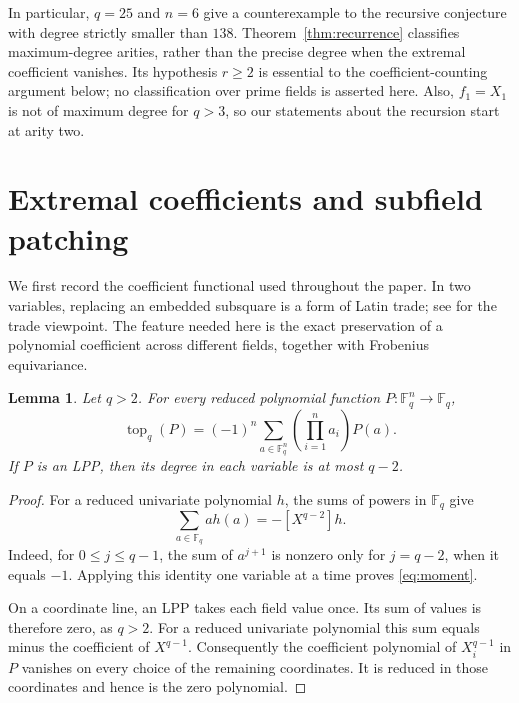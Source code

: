 \documentclass[11pt]{article}
\newtheorem{lemma}[theorem]{Lemma}
\theoremstyle{remark}\newtheorem{remark}[theorem]{Remark}
\newcommand{\F}{\mathbb F}
\newcommand{\topc}{\operatorname{top}}
\begin{document}
In particular, $q=25$ and $n=6$ give a counterexample to the recursive
conjecture with degree strictly smaller than $138$. Theorem~\ref{thm:recurrence}
classifies maximum-degree arities, rather than the precise degree when the
extremal coefficient vanishes. Its hypothesis $r\geq2$ is essential to the
coefficient-counting argument below; no classification over prime fields is
asserted here. Also, $f_1=X_1$ is not of maximum degree for $q>3$, so our
statements about the recursion start at arity two.

\section{Extremal coefficients and subfield patching}

We first record the coefficient functional used throughout the paper.
In two variables, replacing an embedded subsquare is a form of Latin trade;
see \cite[Section 1]{CF} for the trade viewpoint. The feature needed here is
the exact preservation of a polynomial coefficient across different fields,
together with Frobenius equivariance.

\begin{lemma}\label{lem:coefficient}
Let $q>2$. For every reduced polynomial function $P:\F_q^n\to\F_q$,
\begin{equation}\label{eq:moment}
 \topc_q(P)=(-1)^n\sum_{a\in\F_q^n}
 \left(\prod_{i=1}^n a_i\right)P(a).
\end{equation}
If $P$ is an LPP, then its degree in each variable is at most $q-2$.
\end{lemma}

\begin{proof}
For a reduced univariate polynomial $h$, the sums of powers in $\F_q$ give
\[
 \sum_{a\in\F_q}a h(a)=-[X^{q-2}]h.
\]
Indeed, for $0\leq j\leq q-1$, the sum of $a^{j+1}$ is nonzero only for
$j=q-2$, when it equals $-1$. Applying this identity one variable at a time
proves \eqref{eq:moment}.

On a coordinate line, an LPP takes each field value once. Its sum of values is
therefore zero, as $q>2$. For a reduced univariate polynomial this sum equals
minus the coefficient of $X^{q-1}$. Consequently the coefficient polynomial
of $X_i^{q-1}$ in $P$ vanishes on every choice of the remaining coordinates.
It is reduced in those coordinates and hence is the zero polynomial.
\end{proof}
\end{document}
